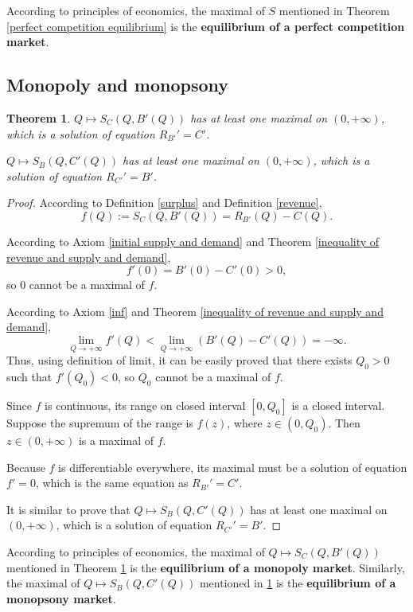 \documentclass{article}
\newtheorem{theorem}{Theorem}
\begin{document}
According to principles of economics,
the maximal of $S$ mentioned in Theorem \ref{perfect competition equilibrium}
is the \textbf{equilibrium of a perfect competition market}.

\subsection{Monopoly and monopsony}

\begin{theorem}
\label{monopoly and monopsony equilibrium}
$Q\mapsto S_C\left(Q,B'\left(Q\right)\right)$ has at least one maximal on $\left(0,+\infty\right)$, which is a solution of equation $R_{B'}'=C'$.

$Q\mapsto S_B\left(Q,C'\left(Q\right)\right)$ has at least one maximal on $\left(0,+\infty\right)$, which is a solution of equation $R_{C'}'=B'$.
\end{theorem}
\begin{proof}
According to Definition \ref{surplus} and Definition \ref{revenue},
$$f\left(Q\right):=S_C\left(Q,B'\left(Q\right)\right)=R_{B'}\left(Q\right)-C\left(Q\right).$$

According to Axiom \ref{initial supply and demand} and Theorem \ref{inequality of revenue and supply and demand},
$$f'\left(0\right)=B'\left(0\right)-C'\left(0\right)>0,$$
so $0$ cannot be a maximal of $f$.

According to Axiom \ref{inf} and Theorem \ref{inequality of revenue and supply and demand},
$$\lim_{Q\to+\infty}f'\left(Q\right)<\lim_{Q\to+\infty}\left(B'\left(Q\right)-C'\left(Q\right)\right)=-\infty.$$
Thus, using definition of limit, it can be easily proved that there exists $Q_0>0$ such that $f'\left(Q_0\right)<0$,
so $Q_0$ cannot be a maximal of $f$.

Since $f$ is continuous, its range on closed interval $\left[0,Q_0\right]$ is a closed interval.
Suppose the supremum of the range is $f\left(z\right)$, where $z\in\left(0,Q_0\right)$.
Then $z\in\left(0,+\infty\right)$ is a maximal of $f$.

Because $f$ is differentiable everywhere, its maximal must be a solution of equation $f'=0$,
which is the same equation as $R_{B'}'=C'$.

It is similar to prove that $Q\mapsto S_B\left(Q,C'\left(Q\right)\right)$ has at least one maximal on $\left(0,+\infty\right)$, which is a solution of equation $R_{C'}'=B'$.
\end{proof}

According to principles of economics,
the maximal of $Q\mapsto S_C\left(Q,B'\left(Q\right)\right)$ mentioned in Theorem \ref{monopoly and monopsony equilibrium}
is the \textbf{equilibrium of a monopoly market}.
Similarly, the maximal of $Q\mapsto S_B\left(Q,C'\left(Q\right)\right)$ mentioned in \ref{monopoly and monopsony equilibrium}
is the \textbf{equilibrium of a monopsony market}.
\end{document}
